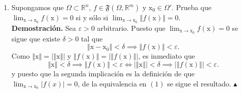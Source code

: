 \documentclass[12pt]{article}
\newcommand{\abs}[1]{\left\vert#1\right\vert}
\newcommand{\norm}[1]{\left\Vert#1\right\Vert}
\newcommand{\F}{\mathfrak F}
\newcommand{\R}{\mathbb R}
\newcommand{\x}{\mathrm x}
\begin{document}
\begin{enumerate}
\begin{enumerate}[(a)]
    \newpage
    \item Notemos que por L'Hôpital 
    \[
    \lim_{x\to 0}\frac{\cos(x)-1}{x} = \lim_{x\to 0}\frac{-\sin(x)}{1} = 0,
    \]
    y
    \[
    \lim_{y\to 0}\frac{\sin(y)}{y} = \lim_{y\to 0}\frac{\cos(y)}{1}=1,
    \]
    y en consecuencia, $\lim_{\x\to \x_0}f(\x)=(0,1)$. \hfill $\blacktriangle$
\end{enumerate}

\item Supongamos que $\Omega\subset \R^n$, $f\in \F(\Omega,\R^m)$ y 
$\x_0\in \Omega'$. Prueba que 
$\displaystyle{\lim_{\x\to \x_0} f(\x) = 0}$ si y s\'olo si 
$\displaystyle{\lim_{\x\to \x_0} \norm{f(\x)} = 0}$. \\
\textbf{Demostración.} Sea $\varepsilon > 0$ arbitrario. Puesto que $\lim_{\x\to \x_0}f(\x) = 0$ se sigue que
existe $\delta > 0$ tal que
\[
\norm{\x-\x_0}<\delta \implies \norm{f(\x)}< \varepsilon.
\]
Como $\norm{\x}=\abs{\norm{\x}}$ y $\norm{f(\x)}=\abs{\norm{f(\x)}}$, es inmediato que
\[
\norm{\x}<\delta \implies \norm{f(\x)}< \varepsilon \iff \abs{\norm{\x}}<\delta \implies \abs{\norm{f(\x)}}< \varepsilon. \tag{1}
\]
y puesto que la segunda implicación es la definición de que $\lim_{\x\to \x_0}\abs{f(x)}=0$, de la equivalencia en $(1)$ se sigue el resultado. \hfill $\blacktriangle$


\end{enumerate}
\end{document}
